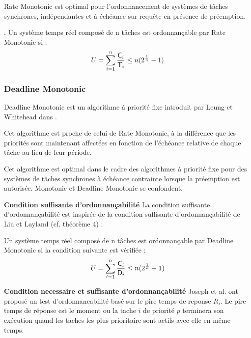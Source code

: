 \begin{theoreme}
Rate Monotonic est optimal pour l'ordonnancement de systèmes de tâches
synchrones, indépendantes et à échéance sur requête en présence de
préemption.
\end{theoreme}

\begin{theoreme}.
  Un système temps réel composé de n tâches est ordonnançable par Rate
  Monotonic si :
\begin{equation}
U = \sum_{i=1}^n \frac{\mathsf{C}_{i}}{\mathsf{T}_{i}} \leq n ( 2^{\frac{1}{n}}
- 1)
\end{equation}
\end{theoreme}

\subsubsection{Deadline Monotonic \cite{LW82}}
Deadline Monotonic est un algorithme à priorité fixe
introduit par Leung et Whitehead dans \cite{LW82}.

Cet algorithme est proche de celui de Rate Monotonic, à la différence
que les priorités sont maintenant affectées en fonction de l'échéance
relative de chaque tâche au lieu de leur période.

\begin{theoreme}
Cet algorithme est optimal dans le cadre des algorithmes à priorité
fixe pour des systèmes de tâches synchrones à échéance contrainte
lorsque la préemption est autorisée. Monotonic et Deadline Monotonic
se confondent.
\end{theoreme}

\textbf{Condition suffisante d'ordonnançabilité} La condition
suffisante d'ordonnançabilité est inspirée de la condition suffisante
d'ordonnançabilité de Liu et Layland (cf. théorème 4) :

\begin{theoreme}
 Un système temps réel composé de n tâches est ordonnançable par Deadline
Monotonic si la condition suivante est vérifiée :
\begin{equation}
U = \sum_{i=1}^n \frac{\mathsf{C}_{i}}{\mathsf{D}_{i}} \leq n ( 2^{\frac{1}{n}} - 1)
\end{equation}
\end{theoreme}

\textbf{Condition necessaire et suffisante d'ordonnançabilité} Joseph
et al. \cite{JP86} ont proposé un test d’ordonnancabilité basé sur le
pire temps de reponse $R_{i}$.  Le pire temps de réponse est le moment
ou la tache $i$ de priorité $p$ terminera son exécution quand les
taches les plus prioritaire sont actifs avec elle en même temps.\\

